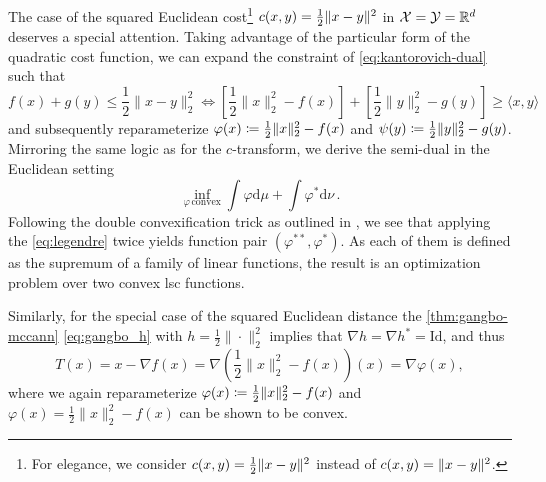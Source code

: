 The case of the squared Euclidean cost\footnote{For elegance, we consider $c(x, y) = \frac{1}{2}\lVert x-y\rVert^2$ instead of $c(x, y) = \lVert x-y\rVert^2$.} $c(x, y) = \frac{1}{2}\lVert x-y\rVert^2$ in ${\mathcal{X}} = {\mathcal{Y}} = \mathbb{R}^d$ deserves a special attention. 
Taking advantage of the particular form of the quadratic cost function, we can expand the constraint of \eqref{eq:kantorovich-dual} such that 
\begin{equation*}
	f(x)+g(y) \leq \frac{1}{2}\|x-y\|_2^2 \Longleftrightarrow  {\left[\frac{1}{2}\|x\|_2^2-f(x)\right]+\left[\frac{1}{2}\|y\|_2^2-g(y)\right] \geq\langle x, y\rangle}
\end{equation*}
and subsequently reparameterize $\varphi(x) \coloneqq \frac{1}{2}\|x\|_2^2-f(x)$ and $\psi(y) \coloneqq \frac{1}{2}\|y\|_2^2-g(y)$.
Mirroring the same logic as for the $c$-transform, we derive the semi-dual in the Euclidean setting 
\begin{equation} \label{eq:dual-cvx}
  \inf_{\varphi\, \text{convex}} \int \varphi \textrm{d}\mu + \int \varphi^*\textrm{d}\nu\,.
\end{equation}
Following the double convexification trick as outlined in \citet[Lemma 2.10]{villani2021topics}, we see that applying the \ref{eq:legendre} twice yields function pair $(\varphi^{**},\varphi^{*})$. As each of them is defined as the supremum of a family of linear functions, the result is an optimization problem over two convex \acrlong{lsc} functions.

Similarly, for the special case of the squared Euclidean distance the \cref{thm:gangbo-mccann} \eqref{eq:gangbo_h} with $h=\frac{1}{2}\|\cdot\|_2^2 $ implies that $\nabla h=\nabla h^*=\mathrm{Id}$, and thus
\begin{equation*}
	T(x)=x-\nabla f(x)=\nabla\left(\frac{1}{2}\|x\|^2_2-f(x)\right)(x)=\nabla \varphi(x),
\end{equation*}
where we again reparameterize $\varphi(x) \coloneqq \frac{1}{2}\|x\|^2_2-f(x)$ and $\varphi(x) = \frac{1}{2}\|x\|_2^2-f(x)$ can be shown to be convex.

